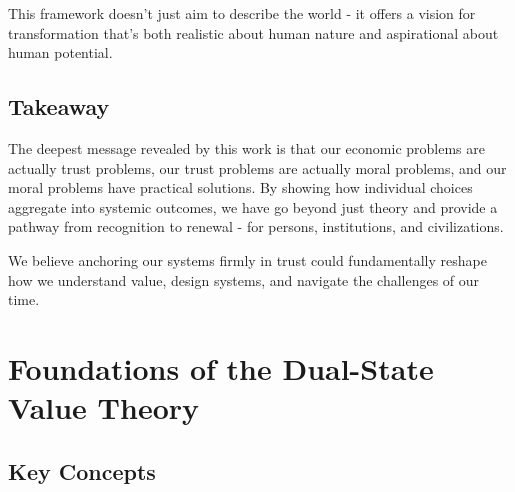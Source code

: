 \documentclass[11pt,oneside]{book}
\begin{document}
This framework doesn't just aim to describe the world - it offers a vision for transformation that's both realistic about human nature and aspirational about human potential.

\section*{Takeaway}

The deepest message revealed by this work is that our economic problems are actually trust problems, our trust problems are actually moral problems, and our moral problems have practical solutions. By showing how individual choices aggregate into systemic outcomes, we have go beyond just theory and provide a pathway from recognition to renewal - for persons, institutions, and civilizations.

We believe anchoring our systems firmly in trust could fundamentally reshape how we understand value, design systems, and navigate the challenges of our time.



\chapter{ Foundations of the Dual-State Value Theory}

\section{Key Concepts}
\end{document}
